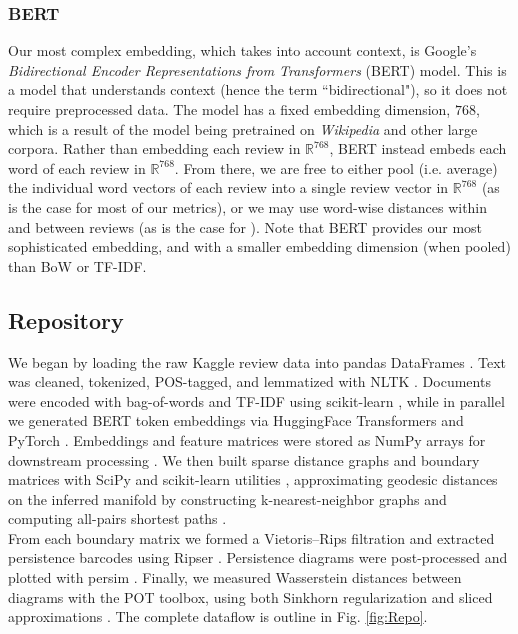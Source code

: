 \documentclass[fleqn,10pt]{SelfArx}
\begin{document}
\subsubsection{BERT}
Our most complex embedding, which takes into account context, is Google's \textit{Bidirectional Encoder Representations from Transformers} (BERT) model. This is a model that understands context (hence the term ``bidirectional"), so it does not require preprocessed data. The model has a fixed embedding dimension, $768$, which is a result of the model being pretrained on \textit{Wikipedia} and other large corpora. Rather than embedding each review in $\mathbb{R}^{768}$, BERT instead embeds each word of each review in $\mathbb{R}^{768}$. From there, we are free to either pool (i.e. average) the individual word vectors of each review into a single review vector in $\mathbb{R}^{768}$ (as is the case for most of our metrics), or we may use word-wise distances within and between reviews (as is the case for ). Note that BERT provides our most sophisticated embedding, and with a smaller embedding dimension (when pooled) than BoW or TF-IDF.

\subsection{Repository}
We began by loading the raw Kaggle review data into pandas DataFrames \cite{kaggle_rotten_tomatoes, mckinney2010pandas}. Text was cleaned, tokenized, POS-tagged, and lemmatized with NLTK \cite{bird2009nltk}. Documents were encoded with bag-of-words and TF-IDF using scikit-learn \cite{pedregosa2011scikit}, while in parallel we generated BERT token embeddings via HuggingFace Transformers and PyTorch \cite{wolf2020transformers,paszke2019pytorch}. Embeddings and feature matrices were stored as NumPy arrays for downstream processing \cite{harris2020array}. We then built sparse distance graphs and boundary matrices with SciPy and scikit-learn utilities \cite{virtanen2020scipy,pedregosa2011scikit}, approximating geodesic distances on the inferred manifold by constructing k-nearest-neighbor graphs and computing all-pairs shortest paths \cite{virtanen2020scipy}.\\
From each boundary matrix we formed a Vietoris–Rips filtration and extracted persistence barcodes using Ripser \cite{bauer2021ripser}. Persistence diagrams were post-processed and plotted with persim \cite{persim2024persim}. Finally, we measured Wasserstein distances between diagrams with the POT toolbox, using both Sinkhorn regularization \cite{cuturi2013sinkhorn} and sliced approximations \cite{bonneel2015sliced,flamary2021pot}. The complete dataflow is outline in Fig. \ref{fig:Repo}.
\end{document}
